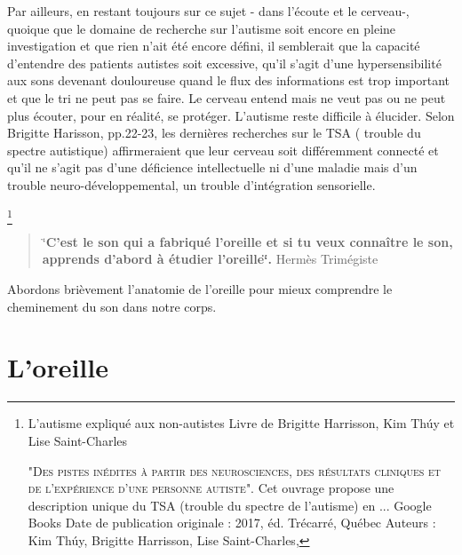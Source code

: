 Par ailleurs, en restant toujours sur ce sujet - dans l'écoute et le cerveau-, quoique que le domaine de recherche sur l'autisme soit encore en pleine investigation et que rien n'ait été encore défini, il semblerait que la capacité d'entendre des patients autistes soit excessive, qu'il s'agit d'une hypersensibilité aux sons devenant douloureuse quand  le flux des informations est trop important et que le tri ne peut pas se faire. Le cerveau entend mais ne veut pas ou ne peut plus  écouter, pour en réalité, se protéger. L'autisme reste difficile à élucider. Selon Brigitte Harisson, pp.22-23, les dernières recherches sur le TSA ( trouble du spectre autistique) affirmeraient que leur cerveau soit différemment connecté et qu'il ne s'agit pas d'une déficience intellectuelle ni d'une maladie mais d'un trouble neuro-développemental, un trouble d'intégration sensorielle.

\footnote{L'autisme expliqué aux non-autistes
Livre de Brigitte Harrisson, Kim Thúy et Lise Saint-Charles

\textsc{"Des pistes inédites à partir des neurosciences, des résultats cliniques et de l'expérience d'une personne autiste".} Cet ouvrage propose une description unique du TSA (trouble du spectre de l'autisme) en ... Google Books
Date de publication originale : 2017, éd. Trécarré, Québec
Auteurs : Kim Thúy, Brigitte Harrisson, Lise Saint-Charles,
	
}




\begin{quotation}
	\char`\"{}\textbf{C'est le son qui a fabriqué l'oreille et si tu veux connaître
		le son, apprends d'abord à étudier l\textquoteright oreille\char`\"{}.}
	Hermès Trimégiste
\end{quotation}
Abordons brièvement l'anatomie de l'oreille pour mieux comprendre le cheminement du son dans notre corps.
\section{L'oreille}
